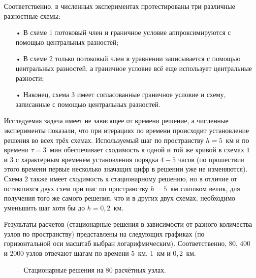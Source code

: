 \documentclass[14pt, a4paper, fleqn, twoside]{extreport}
\begin{document}
Соответственно, в численных экспериментах протестированы три различные разностные схемы: 
\begin{itemize}
\item[•] В схеме $1$ потоковый член и граничное условие аппроксимируются с помощью центральных разностей; 
\item[•] В схеме $2$ только потоковый член в уравнении записывается с помощью центральных разностей, а граничное условие всё еще использует центральные разности;
\item[•] Наконец, схема $3$ имеет согласованные граничное условие и схему, записанные с помощью центральных разностей.
\end{itemize}

Исследуемая задача имеет не зависящее от времени решение, а численные эксперименты показали, что при итерациях по времени происходит установление решения во всех трёх схемах. Используемый шаг по пространству $h = 5$~км и по времени $\tau = 3$~мин обеспечивает сходимость к одной и той же кривой в схемах $1$ и $3$ с характерным временем установления порядка $4-5$ часов (по прошествии этого времени первые несколько значащих цифр в решении уже не изменяются). Схема $2$ также имеет сходимость к стационарному решению, но в отличие от оставшихся двух схем при шаг по пространству $h=5$~км слишком велик, для получения того же самого решения, что и в других двух схемах, необходимо уменьшить шаг хотя бы до $h = 0{,}2$~км.

Результаты расчетов (стационарные решения в зависимости от разного количества узлов по пространству) представлены на следующих графиках (по горизонтальной оси масштаб выбран логарифмическим). Соответственно, $80$, $400$ и $2000$ узлов отвечают шагам по времени $5$~км, $1$~км и $0{,}2$~км.
 
\begin{figure}[H]
\caption{Стационарные решения на $80$ расчётных узлах.}
\end{figure}
\end{document}
